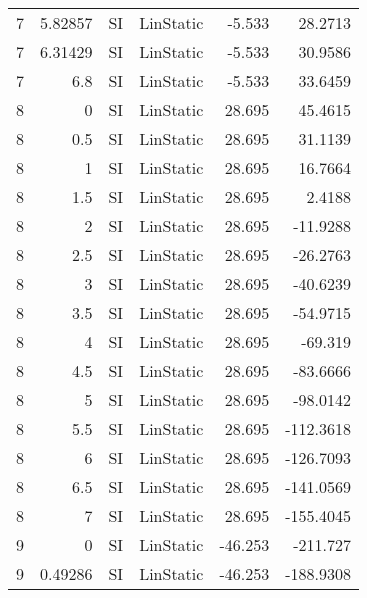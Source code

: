 \begin{table}[htbp]
{\begin{tabular}{rrrlrr}
    \multicolumn{1}{l}{7} & 5.82857 & \multicolumn{1}{l}{SI} & LinStatic & -5.533 & 28.2713 \\
    \multicolumn{1}{l}{7} & 6.31429 & \multicolumn{1}{l}{SI} & LinStatic & -5.533 & 30.9586 \\
    \multicolumn{1}{l}{7} & 6.8 & \multicolumn{1}{l}{SI} & LinStatic & -5.533 & 33.6459 \\
    \multicolumn{1}{l}{8} & 0   & \multicolumn{1}{l}{SI} & LinStatic & 28.695 & 45.4615 \\
    \multicolumn{1}{l}{8} & 0.5 & \multicolumn{1}{l}{SI} & LinStatic & 28.695 & 31.1139 \\
    \multicolumn{1}{l}{8} & 1   & \multicolumn{1}{l}{SI} & LinStatic & 28.695 & 16.7664 \\
    \multicolumn{1}{l}{8} & 1.5 & \multicolumn{1}{l}{SI} & LinStatic & 28.695 & 2.4188 \\
    \multicolumn{1}{l}{8} & 2   & \multicolumn{1}{l}{SI} & LinStatic & 28.695 & -11.9288 \\
    \multicolumn{1}{l}{8} & 2.5 & \multicolumn{1}{l}{SI} & LinStatic & 28.695 & -26.2763 \\
    \multicolumn{1}{l}{8} & 3   & \multicolumn{1}{l}{SI} & LinStatic & 28.695 & -40.6239 \\
    \multicolumn{1}{l}{8} & 3.5 & \multicolumn{1}{l}{SI} & LinStatic & 28.695 & -54.9715 \\
    \multicolumn{1}{l}{8} & 4   & \multicolumn{1}{l}{SI} & LinStatic & 28.695 & -69.319 \\
    \multicolumn{1}{l}{8} & 4.5 & \multicolumn{1}{l}{SI} & LinStatic & 28.695 & -83.6666 \\
    \multicolumn{1}{l}{8} & 5   & \multicolumn{1}{l}{SI} & LinStatic & 28.695 & -98.0142 \\
    \multicolumn{1}{l}{8} & 5.5 & \multicolumn{1}{l}{SI} & LinStatic & 28.695 & -112.3618 \\
    \multicolumn{1}{l}{8} & 6   & \multicolumn{1}{l}{SI} & LinStatic & 28.695 & -126.7093 \\
    \multicolumn{1}{l}{8} & 6.5 & \multicolumn{1}{l}{SI} & LinStatic & 28.695 & -141.0569 \\
    \multicolumn{1}{l}{8} & 7   & \multicolumn{1}{l}{SI} & LinStatic & 28.695 & -155.4045 \\
    \multicolumn{1}{l}{9} & 0   & \multicolumn{1}{l}{SI} & LinStatic & -46.253 & -211.727 \\
    \multicolumn{1}{l}{9} & 0.49286 & \multicolumn{1}{l}{SI} & LinStatic & -46.253 & -188.9308 \\

\end{tabular}}
\end{table}
